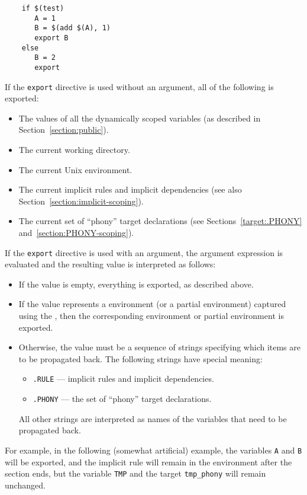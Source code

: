 \begin{verbatim}
    if $(test)
       A = 1
       B = $(add $(A), 1)
       export B
    else
       B = 2
       export
\end{verbatim}

If the \verb+export+ directive is used without an argument, all of the following is exported:
\begin{itemize}
\item The values of all the dynamically scoped variables (as described in
Section~\ref{section:public}).
\item The current working directory.
\item The current Unix environment.
\item The current implicit rules and implicit dependencies (see also
Section~\ref{section:implicit-scoping}).
\item The current set of ``phony'' target declarations (see Sections~\ref{target:.PHONY}
and~\ref{section:PHONY-scoping}).
\end{itemize}

If the \verb+export+ directive is used with an argument, the argument expression is evaluated
and the resulting value is interpreted as follows:
\begin{itemize}
\item If the value is empty, everything is exported, as described above.
\item If the value represents a environment (or a partial environment) captured using the
, then the corresponding environment or partial
environment is exported.
\item Otherwise, the value must be a sequence of strings specifying which items are to be propagated
back. The following strings have special meaning:
\begin{itemize}
\item {}\verb+.RULE+ --- implicit rules and implicit dependencies.
\item {}\verb+.PHONY+ --- the set of ``phony'' target declarations.
\end{itemize}
All other strings are interpreted as names of the variables that need to be propagated back.
\end{itemize}

For example, in the following (somewhat artificial) example, the variables \verb+A+ and \verb+B+
will be exported, and the implicit rule will remain in the environment after the section ends, but
the variable \verb+TMP+ and the target \verb+tmp_phony+ will remain unchanged.

